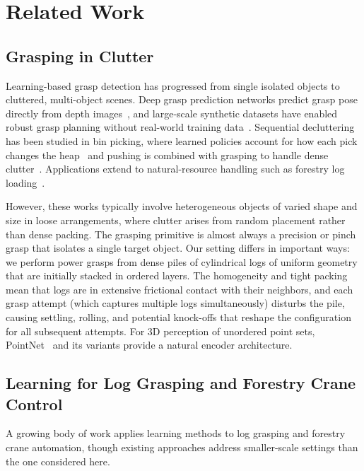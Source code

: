 \documentclass[conference]{IEEEtran}
\begin{document}
\section{Related Work}

\subsection{Grasping in Clutter}
Learning-based grasp detection has progressed from single isolated objects to cluttered, multi-object scenes.                                       
Deep grasp prediction networks predict grasp pose directly from depth images~\cite{morrison2018closing, kumra2017robotic}, and large-scale
synthetic datasets have enabled robust grasp planning without real-world
training data~\cite{mahler2017dexnet}.
Sequential decluttering has been studied in bin picking, where learned
policies account for how each pick changes the
heap~\cite{mahler2017sequential} and pushing is combined with grasping to
handle dense clutter~\cite{zeng2018learning}.
Applications extend to natural-resource handling such as forestry log loading~\cite{wallin2024multilog}.

However, these works typically involve heterogeneous objects of varied shape and size in loose arrangements, where clutter arises from random placement rather than dense packing.
The grasping primitive is almost always a precision or pinch grasp that isolates a single target object.
Our setting differs in important ways: we perform power grasps from dense piles of cylindrical logs of uniform geometry that are initially stacked in ordered layers.
The homogeneity and tight packing mean that logs are in extensive frictional contact with their neighbors, and each grasp attempt (which captures multiple logs simultaneously) disturbs the pile, causing settling, rolling, and potential knock-offs that reshape the configuration for all subsequent attempts.
For 3D perception of unordered point sets, PointNet~\cite{qi2017pointnet} and its variants provide a natural encoder architecture.

\subsection{Learning for Log Grasping and Forestry Crane Control}
A growing body of work applies learning methods to log grasping and forestry crane automation, though existing approaches address smaller-scale settings than the one considered here.
\end{document}
